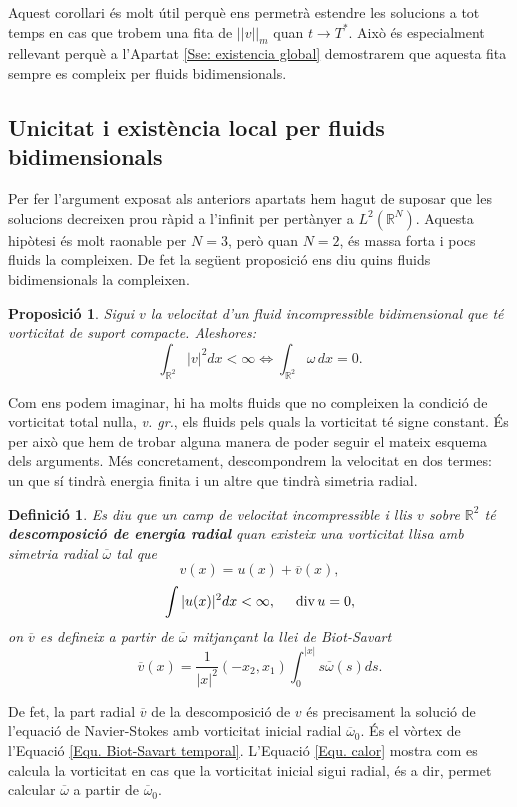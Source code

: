 \documentclass{article}
\numberwithin{equation}{section}
\DeclareMathOperator{\diver}{div}
\newtheorem{definicio}{Definici\'{o}}[section]
\newtheorem{proposicio}{Proposici\'{o}}[section]
\begin{document}
Aquest corol\textperiodcentered lari \'{e}s molt \'{u}til perqu\`{e} ens permetr\`{a} estendre les solucions a tot temps en cas que trobem una fita de $||v||_m$ quan $t\to T^*$. Aix\`{o} \'{e}s especialment rellevant perqu\`{e} a l'Apartat \ref{Sse: existencia global} demostrarem que aquesta fita sempre es compleix per fluids bidimensionals.

\subsection{Unicitat i exist\`{e}ncia local per fluids bidimensionals}

Per fer l'argument exposat als anteriors apartats hem hagut de suposar que les solucions decreixen prou r\`{a}pid a l'infinit per pert\`{a}nyer a $L^2(\mathbb{R}^N)$. Aquesta hip\`{o}tesi \'{e}s molt raonable per $N=3$, per\`{o} quan $N=2$, \'{e}s massa forta i pocs fluids la compleixen. De fet la seg\"{u}ent proposici\'{o} ens diu quins fluids bidimensionals la compleixen.

\begin{proposicio}
Sigui $v$ la velocitat d'un fluid incompressible bidimensional que t\'{e} vorticitat de suport compacte. Aleshores:
\[\int_{\mathbb{R}^2}|v|^2dx<\infty\Longleftrightarrow\int_{\mathbb{R}^2}\omega\,dx=0.\]
\end{proposicio}

Com ens podem imaginar, hi ha molts fluids que no compleixen la condici\'{o} de vorticitat total nul\textperiodcentered la, \emph{v. gr.}, els fluids pels quals la vorticitat t\'{e} signe constant. \'{E}s per aix\`{o} que hem de trobar alguna manera de poder seguir el mateix esquema dels arguments. M\'{e}s concretament, descompondrem la velocitat en dos termes: un que s\'{i} tindr\`{a} energia finita i un altre que tindr\`{a} simetria radial.

\begin{definicio}
Es diu que un camp de velocitat incompressible i llis $v$ sobre $\mathbb{R}^2$ t\'{e} \textbf{descomposici\'{o} de energia radial} quan existeix una vorticitat llisa amb simetria radial $\overline\omega$ tal que
\[v(x)=u(x)+\overline v(x),\]
\[\int|u(x)|^2dx<\infty,\hspace{5mm}\diver u=0,\]
on $\overline v$ es defineix a partir de $\overline\omega$ mitjan\c{c}ant la llei de Biot-Savart
\[\overline v(x)=\frac{1}{|x|^2}(-x_2,x_1)\int_0^{|x|}s\overline\omega(s)ds.\]
\end{definicio}

De fet, la part radial $\overline v$ de la descomposici\'{o} de $v$ \'{e}s precisament la soluci\'{o} de l'equaci\'{o} de Navier-Stokes amb vorticitat inicial radial $\overline\omega_0$. \'{E}s el v\`{o}rtex de l'Equaci\'{o} \eqref{Equ. Biot-Savart temporal}. L'Equaci\'{o} \eqref{Equ. calor} mostra com es calcula la vorticitat en cas que la vorticitat inicial sigui radial, \'{e}s a dir, permet calcular $\overline\omega$ a partir de $\overline\omega_0$.
\end{document}
